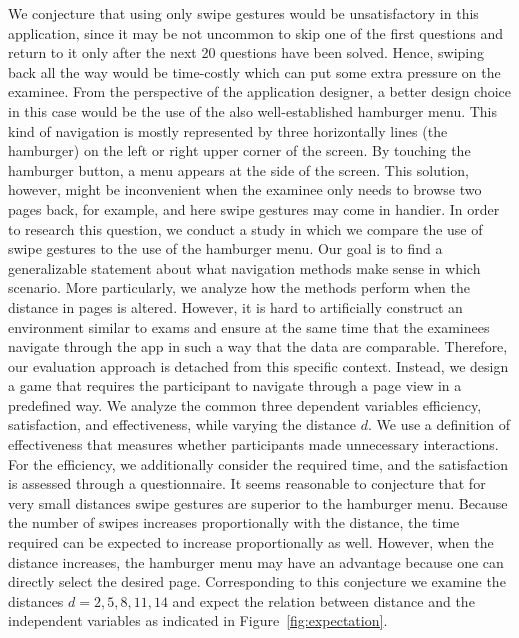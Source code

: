 \documentclass{sig-alternate-05-2015}
\begin{document}
We conjecture that using only swipe gestures would be unsatisfactory in this application, since it may be not uncommon to skip one of the first questions and
return to it only after the next 20 questions have been solved. Hence, swiping back all the way would be time-costly which can put some extra pressure on the examinee.
From the perspective of the application designer, a better design choice in this case would be the use of the also well-established hamburger menu. 
This kind of navigation is mostly represented by three horizontally lines (the hamburger) on the left or right upper corner of the screen.
By touching the hamburger button, a menu appears at the side of the screen. This solution, however, might be inconvenient when the examinee only needs to browse two pages back, for example,
and here swipe gestures may come in handier.
In order to research this question, we conduct a study in which we compare the use of swipe gestures to the use of the hamburger menu.
Our goal is to find a generalizable statement about what navigation methods make sense in which scenario. More particularly, we analyze how the methods perform when the
distance in pages is altered.
However, it is hard to artificially construct an environment similar to exams and ensure at the same time that the examinees navigate through the app
in such a way that the data are comparable. Therefore, our evaluation approach is detached from this specific context. Instead, we design a game that requires the participant to
navigate through a page view in a predefined way. 
We analyze the common three dependent variables efficiency, satisfaction, and effectiveness, while varying the distance $d$.
We use a definition of effectiveness that measures whether participants made unnecessary interactions. For the efficiency, we additionally consider the required time, and the satisfaction
is assessed through a questionnaire.
It seems reasonable to conjecture that for very small distances swipe gestures are superior to the hamburger
menu. Because the number of swipes increases proportionally with the distance, the time required can be expected to increase 
proportionally as well. However, when the distance increases, the hamburger menu
may have an advantage because one can directly select the desired page. Corresponding to this conjecture we examine the distances $d = 2, 5, 8, 11, 14$ and
expect the relation between distance and the independent variables as indicated in Figure~\ref{fig:expectation}.
\end{document}
